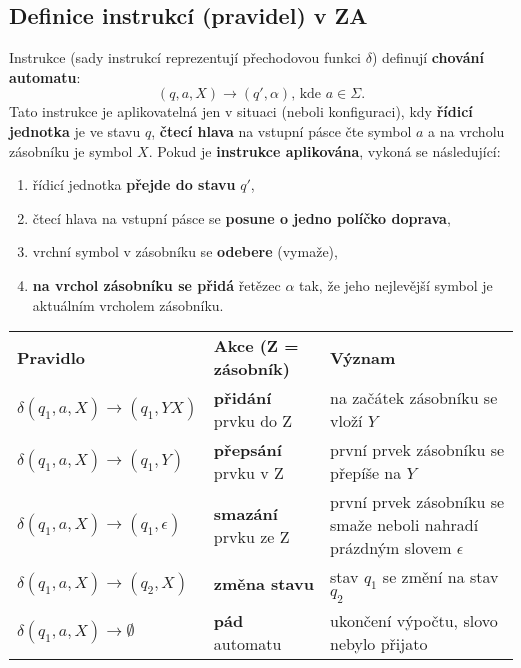 \subsection{Definice instrukcí (pravidel) v ZA}
Instrukce (sady instrukcí reprezentují přechodovou funkci $\delta$) definují \textbf{chování automatu}:
\begin{equation}
    (q, a, X) \rightarrow (q', \alpha)\textrm{, kde } a\in \Sigma.
\end{equation}
Tato instrukce je aplikovatelná jen v situaci (neboli konfiguraci), kdy \textbf{řídicí jednotka} je ve stavu $q$, \textbf{čtecí hlava} na vstupní pásce čte symbol $a$ a na vrcholu zásobníku je symbol $X$. Pokud je \textbf{instrukce aplikována}, vykoná se následující:
\begin{enumerate}
    \item řídicí jednotka \textbf{přejde do stavu} $q'$,
    \item čtecí hlava na vstupní pásce se \textbf{posune o jedno políčko doprava},
    \item vrchní symbol v zásobníku se \textbf{odebere} (vymaže),
    \item \textbf{na vrchol zásobníku se přidá} řetězec $\alpha$ tak, že jeho nejlevější symbol je aktuálním vrcholem zásobníku.
\end{enumerate}

\begin{table}[H]
    \vspace{-2mm}
    \centering
    \begin{tabular}{l|l|p{6.5cm}}
        \textbf{Pravidlo}                                 & \textbf{Akce (Z = zásobník)} & \textbf{Význam}                                                          \\\hhline
        $ \delta(q_1, a, X) \rightarrow (q_1, YX) $       & \textbf{přidání} prvku do Z  & na začátek zásobníku se vloží $Y$                                        \\
        $ \delta(q_1, a, X) \rightarrow (q_1, Y) $        & \textbf{přepsání} prvku v Z  & první prvek zásobníku se přepíše na $Y$                                  \\
        $ \delta(q_1, a, X) \rightarrow (q_1, \epsilon) $ & \textbf{smazání} prvku ze Z  & první prvek zásobníku se smaže neboli nahradí prázdným slovem $\epsilon$ \\
        $ \delta(q_1, a, X)\rightarrow(q_2, X) $          & \textbf{změna stavu}         & stav $ q_1 $ se změní na stav $ q_2 $                                    \\
        $\delta(q_1, a, X)\rightarrow\emptyset$           & \textbf{pád} automatu        & ukončení výpočtu, slovo nebylo přijato                                   \\
    \end{tabular}
\end{table}

